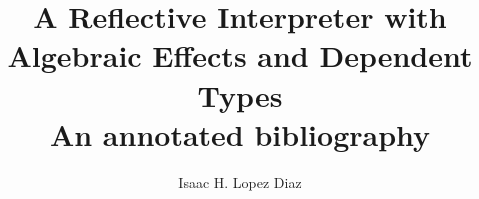 \documentclass{article}
\title{A Reflective Interpreter with Algebraic Effects and Dependent Types \\ An annotated bibliography}
\author{Isaac H. Lopez Diaz}
\begin{document}
\maketitle
\nocite*{}


\end{document}
